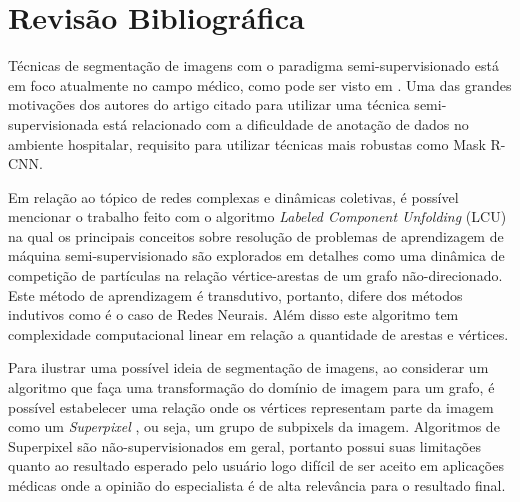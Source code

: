\chapter{Revisão Bibliográfica}\label{cap:revisao-bibliografica}

Técnicas de segmentação de imagens com o paradigma semi-supervisionado
está em foco atualmente no campo médico, como pode ser visto em
\cite{LuoSemiSupervised2021}. Uma das grandes motivações dos autores
do artigo citado para utilizar uma técnica semi-supervisionada está
relacionado com a dificuldade de anotação de dados no ambiente
hospitalar, requisito para utilizar técnicas mais robustas como Mask R-CNN.

Em relação ao tópico de redes complexas e dinâmicas coletivas, é
possível mencionar o trabalho feito com o algoritmo \textit{Labeled
Component Unfolding} (LCU) \cite{VerriNetworkUnfoldingMap2018} na
qual os principais conceitos sobre resolução de problemas de
aprendizagem de máquina semi-supervisionado são explorados em detalhes
como uma dinâmica de competição de partículas na relação
vértice-arestas de um grafo não-direcionado. Este método de
aprendizagem é transdutivo, portanto, difere dos métodos indutivos
como é o caso de Redes Neurais. Além disso este algoritmo tem
complexidade computacional linear em relação a quantidade de arestas e
vértices.

Para ilustrar uma possível ideia de segmentação de imagens, ao
considerar um algoritmo que faça uma transformação do domínio de imagem para um
grafo, é possível estabelecer uma relação onde os vértices representam
parte da imagem como um \textit{Superpixel}
\cite{SuperpixelSurvey2020}, ou seja, um grupo de subpixels da
imagem. Algoritmos de Superpixel são não-supervisionados em geral,
portanto possui suas limitações quanto ao resultado esperado pelo
usuário \textendash logo difícil de ser aceito em aplicações médicas onde a
opinião do especialista é de alta relevância para o resultado final.

\begin{figure}[!h]
        \captionsetup{width=8cm}
		\centering
\end{figure}



